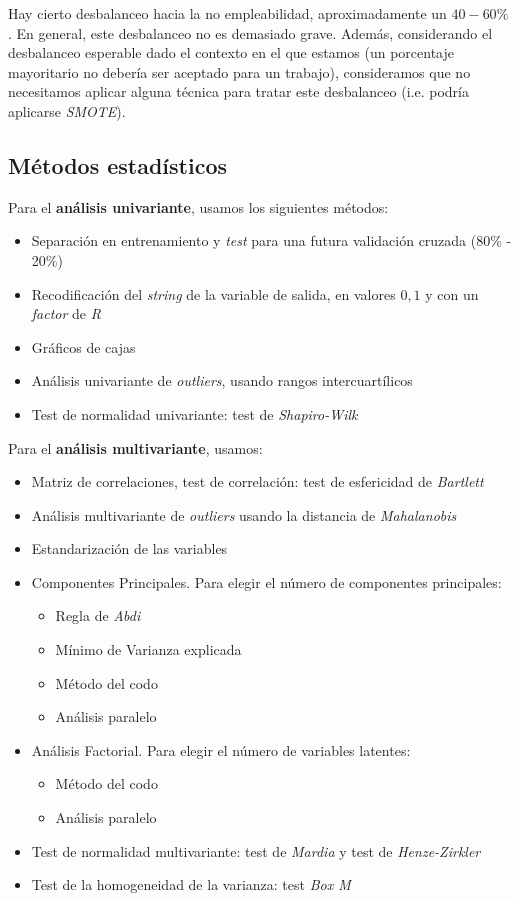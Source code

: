 Hay cierto desbalanceo hacia la no empleabilidad, aproximadamente un $40-60\%$. En general, este desbalanceo no es demasiado grave. Además, considerando el desbalanceo esperable dado el contexto en el que estamos (un porcentaje mayoritario no debería ser aceptado para un trabajo), consideramos que no necesitamos aplicar alguna técnica para tratar este desbalanceo (i.e. podría aplicarse \textit{SMOTE}).

\subsection{Métodos estadísticos}

Para el \textbf{análisis univariante}, usamos los siguientes métodos:

\begin{itemize}
    \item Separación en entrenamiento y \textit{test} para una futura validación cruzada (80\% - 20\%)
    \item Recodificación del \textit{string} de la variable de salida, en valores $0, 1$ y con un \textit{factor} de \textit{R}
    \item Gráficos de cajas
    \item Análisis univariante de \textit{outliers}, usando rangos intercuartílicos
    \item Test de normalidad univariante: test de \textit{Shapiro-Wilk}
\end{itemize}

Para el \textbf{análisis multivariante}, usamos:


\begin{itemize}
    \item Matriz de correlaciones, test de correlación: test de esfericidad de \textit{Bartlett}
    \item Análisis multivariante de \textit{outliers} usando la distancia de \textit{Mahalanobis}
    \item Estandarización de las variables
    \item Componentes Principales. Para elegir el número de componentes principales:
        \begin{itemize}
            \item Regla de \textit{Abdi}
            \item Mínimo de Varianza explicada
            \item Método del codo
            \item Análisis paralelo
        \end{itemize}
    \item Análisis Factorial. Para elegir el número de variables latentes:
        \begin{itemize}
            \item Método del codo
            \item Análisis paralelo
        \end{itemize}
    \item Test de normalidad multivariante: test de \textit{Mardia} y test de \textit{Henze-Zirkler}
    \item Test de la homogeneidad de la varianza: test \textit{Box M}
\end{itemize}

